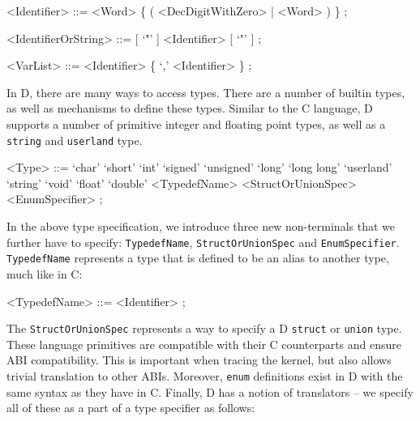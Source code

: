 \begin{grammar}
<Identifier> ::= <Word> \{ ( <DecDigitWithZero> | <Word> ) \} ;

<IdentifierOrString> ::= [ `"' ] <Identifier> [ `"' ] ;

<VarList> ::= <Identifier> \{ `,' <Identifier> \} ;
\end{grammar}

\noindent
In D, there are many ways to access types. There are a number of
builtin types, as well as mechanisms to define these types. Similar to
the C language, D supports a number of primitive integer and floating
point types, as well as a \texttt{string} and
\texttt{userland} type.

\begin{grammar}
<Type> ::=  `char'
       \alt `short'
       \alt `int'
       \alt `signed'
       \alt `unsigned'
       \alt `long'
       \alt `long long'
       \alt `userland'
       \alt `string'
       \alt `void'
       \alt `float'
       \alt `double'
       \alt <TypedefName>
       \alt <StructOrUnionSpec>
       \alt <EnumSpecifier> ;
\end{grammar}

\noindent
In the above type specification, we introduce three new non-terminals that we
further have to specify: \texttt{TypedefName}, \texttt{StructOrUnionSpec} and
\texttt{EnumSpecifier}.  \texttt{TypedefName} represents a type that is defined
to be an alias to another type, much like in C:

\begin{grammar}
<TypedefName> ::= <Identifier> ;
\end{grammar}

\noindent
The \texttt{StructOrUnionSpec} represents a way to specify a D
\texttt{struct} or \texttt{union} type. These language primitives are
compatible with their C counterparts and ensure ABI
compatibility. This is important when tracing the kernel, but also
allows trivial translation to other ABIs. Moreover, \texttt{enum}
definitions exist in D with the same syntax as they have in
C. Finally, D has a notion of translators -- we specify all of these
as a part of a type specifier as follows:

